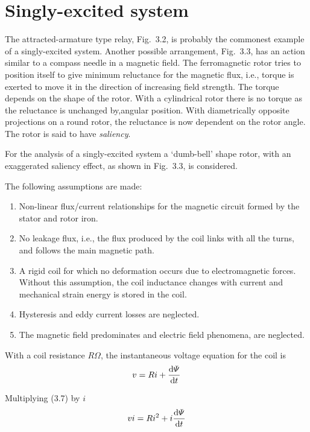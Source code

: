 \documentclass[a4paper,numbers=noenddot,12pt]{scrbook}
\begin{document}
\section{Singly-excited system} 
The attracted-armature type relay, Fig.\ 3.2, is probably the commonest example of a singly-excited system. Another possible arrangement, Fig.\ 3.3, has an action similar to a compass needle in a magnetic field. The ferromagnetic rotor tries to position itself to give minimum reluctance for the magnetic flux, i.e., torque is exerted to move it in the direction of increasing field strength. The torque depends on the shape of the rotor. With a cylindrical rotor there is no torque as the reluctance
is unchanged by,angular position. With diametrically opposite projections on a round rotor, the reluctance is now dependent on the rotor angle. The rotor is said to have 
\textit{saliency}.

For the analysis of a singly-excited system a `dumb-bell' shape rotor, with an exaggerated saliency effect, as shown in Fig.\ 3.3, is considered. 

The following assumptions are made:
\begin{enumerate}
    \item Non-linear flux/current relationships for the magnetic circuit formed by the stator and rotor iron.
    \item No leakage flux, i.e., the flux produced by the coil links with all the turns, and follows the main magnetic path.
    \item A rigid coil for which no deformation occurs due to electromagnetic forces. Without this assumption, the coil inductance changes with current and mechanical strain energy is stored in the coil.
    \item Hysteresis and eddy current losses are neglected.
    \item The magnetic field predominates and electric field phenomena, are neglected. 
\end{enumerate}

With a coil resistance $R \Omega$, the instantaneous voltage equation for the coil is
\begin{equation}
    v = Ri + \dfrac{\dif \varPsi}{\dif t}
    \label{eq:Eq3.7}
\end{equation}

Multiplying (3.7) by $i$
\begin{equation}
    vi = Ri^2 + i \dfrac{\dif \varPsi}{\dif t}
    \label{eq:Eq3.8}
\end{equation}
\end{document}
